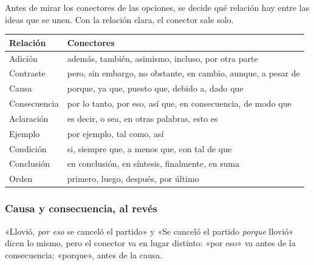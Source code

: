 

Antes de mirar los conectores de las opciones, se decide qué relación hay entre las ideas que se unen. Con la relación
clara, el conector sale solo.

\begin{center}\small
\begin{tabularx}{\linewidth}{@{}l>{\raggedright\arraybackslash}X@{}}
\toprule
\textbf{Relación} & \textbf{Conectores}\\\midrule
Adición & además, también, asimismo, incluso, por otra parte\\
Contraste & pero, sin embargo, no obstante, en cambio, aunque, a pesar de\\
Causa & porque, ya que, puesto que, debido a, dado que\\
Consecuencia & por lo tanto, por eso, así que, en consecuencia, de modo que\\
Aclaración & es decir, o sea, en otras palabras, esto es\\
Ejemplo & por ejemplo, tal como, así\\
Condición & si, siempre que, a menos que, con tal de que\\
Conclusión & en conclusión, en síntesis, finalmente, en suma\\
Orden & primero, luego, después, por último\\\bottomrule
\end{tabularx}
\end{center}

\subsubsection{Causa y consecuencia, al revés}
«Llovió, \emph{por eso} se canceló el partido» y «Se canceló el partido \emph{porque} llovió» dicen lo mismo, pero el
conector va en lugar distinto: «por eso» va antes de la consecuencia; «porque», antes de la causa.

